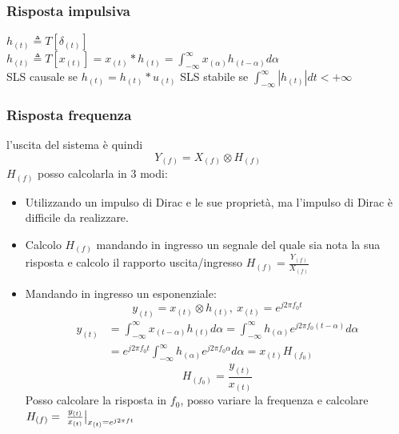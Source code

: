         \subsubsection{Risposta impulsiva}
            $h_{(t)} \triangleq T[\delta_{(t)}]$\\
            $h_{(t)} \triangleq T[x_{(t)}] = x_{(t)}\ast h_{(t)} = \int_{-\infty}^{\infty}x_{(\alpha)}h_{(t-\alpha)}d\alpha$\\
            SLS causale se $h_{(t)} = h_{(t)}\ast u_{(t)}$ 
            SLS stabile se $\int_{-\infty}^{\infty}|h_{(t)}| dt < +\infty$ 
        \subsubsection{Risposta frequenza}
            l'uscita del sistema è quindi 
            \[
                Y_{(f)} = X_{(f)}\otimes H_{(f)}
            \]
            $H_{(f)}$ posso calcolarla in 3 modi:
            \begin{itemize}
                \item {
                    Utilizzando un impulso di Dirac e le sue proprietà, ma l'impulso di Dirac è difficile da realizzare. 
                }
                \item {
                    Calcolo $H_{(f)}$ mandando in ingresso un segnale del quale sia nota la sua risposta e calcolo il rapporto uscita/ingresso 
                    $H_{(f)} = \frac{Y_{(f)}}{X_{(f)}}$
                }
                \item {
                    Mandando in ingresso un esponenziale:
                    \[
                        y_{(t)} = x_{(t)}\otimes h_{(t)},\ x_{(t)} = e^{j2\pi f_0t}
                    \]
                    \begin{align}
                        y_{(t)} &= \int_{-\infty}^{\infty}x_{(t-\alpha)}h_{(t)}d\alpha = \int_{-\infty}^{\infty}h_{(\alpha)} e^{j2\pi f_0(t-\alpha)}d\alpha \nonumber \\
                                &= e^{j2\pi f_0t}\int_{-\infty}^{\infty}h_{(\alpha)} e^{j2\pi f_0\alpha}d\alpha = x_{(t)}H_{(f_0)} \nonumber 
                    \end{align}
                    \[
                        H_{(f_0)} = \frac{y_{(t)}}{x_{(t)}}
                    \]  
                    Posso calcolare la risposta in $f_0$, posso variare la frequenza e calcolare $H_{(f)} = \eval*{\frac{y_{(t)}}{x_{(t)}}}_{x_{(t)} = e^{j2\pi ft}}$
                }
            \end{itemize}

